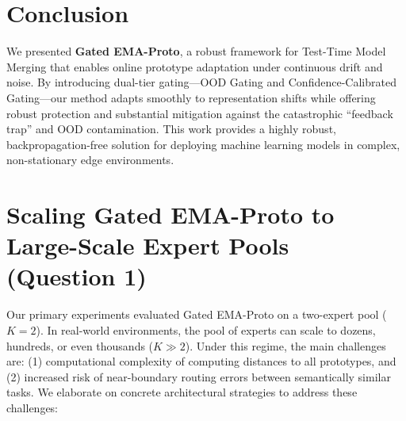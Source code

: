 \documentclass{article}
\theoremstyle{plain}
\theoremstyle{definition}
\theoremstyle{remark}
\begin{document}
\section{Conclusion}
We presented \textbf{Gated EMA-Proto}, a robust framework for Test-Time Model Merging that enables online prototype adaptation under continuous drift and noise. By introducing dual-tier gating—OOD Gating and Confidence-Calibrated Gating—our method adapts smoothly to representation shifts while offering robust protection and substantial mitigation against the catastrophic ``feedback trap'' and OOD contamination. This work provides a highly robust, backpropagation-free solution for deploying machine learning models in complex, non-stationary edge environments.




\newpage
\appendix
\onecolumn

\section{Scaling Gated EMA-Proto to Large-Scale Expert Pools (Question 1)}
\label{app:scaling}
Our primary experiments evaluated Gated EMA-Proto on a two-expert pool ($K=2$). In real-world environments, the pool of experts can scale to dozens, hundreds, or even thousands ($K \gg 2$). Under this regime, the main challenges are: (1) computational complexity of computing distances to all prototypes, and (2) increased risk of near-boundary routing errors between semantically similar tasks. We elaborate on concrete architectural strategies to address these challenges:
\end{document}
